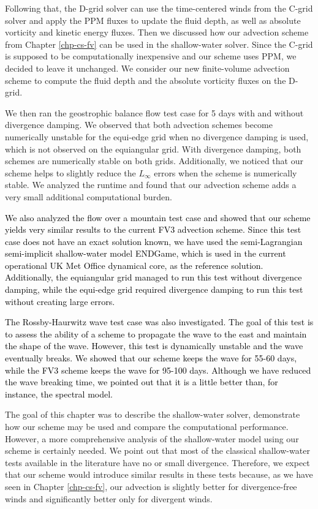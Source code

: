 Following that, the D-grid solver can use the time-centered winds from the C-grid solver and apply the PPM fluxes to update the fluid depth,
as well as absolute vorticity and kinetic energy fluxes. 
Then we discussed how our advection scheme from Chapter \ref{chp-cs-fv} can be used in the shallow-water solver. 
Since the C-grid is supposed to be computationally inexpensive and our scheme uses PPM, we decided to leave it unchanged. 
We consider our new finite-volume advection scheme to compute the fluid depth and the absolute vorticity fluxes on the D-grid.

We then ran the geostrophic balance flow test case for 5 days with and without divergence damping.
We observed that both advection schemes become numerically unstable for the equi-edge grid when no divergence damping is used,
which is not observed on the equiangular grid.
With divergence damping, both schemes are numerically stable on both grids.
Additionally, we noticed that our scheme helps to slightly reduce the $L_{\infty}$ errors when the scheme is numerically stable.
We analyzed the runtime and found that our advection scheme adds a very small additional computational burden.

\textcolor{black}{
We also analyzed the flow over a mountain test case and showed that our scheme yields very similar results to the current FV3 advection scheme.
Since this test case does not have an exact solution known, we have used the semi-Lagrangian semi-implicit shallow-water model ENDGame, 
which is used in the current operational UK Met Office dynamical core, as the reference solution.
Additionally, the equiangular grid managed to run this test without divergence damping,
while the equi-edge grid required divergence damping to run this test without creating large errors.}

\textcolor{black}{
The Rossby-Haurwitz wave test case was also investigated. 
The goal of this test is to assess the ability of a scheme to propagate the wave to the east and maintain the shape of the wave. 
However, this test is dynamically unstable and the wave eventually breaks. 
We showed that our scheme keeps the wave for 55-60 days, while the FV3 scheme keeps the wave for 95-100 days. 
Although we have reduced the wave breaking time, we pointed out that it is a little better than, for instance, the spectral model.}

The goal of this chapter was to describe the shallow-water solver, demonstrate how our scheme may be used and compare the computational performance.
However, a more comprehensive analysis of the shallow-water model using our scheme is certainly needed. 
We point out that most of the classical shallow-water tests available in the literature \citep{will:1992, galewsky:2004} have no or small divergence. 
Therefore, we expect that our scheme would introduce similar results in these tests because,
 as we have seen in Chapter \ref{chp-cs-fv}, our advection is slightly better for divergence-free winds and  significantly better only for divergent winds.
